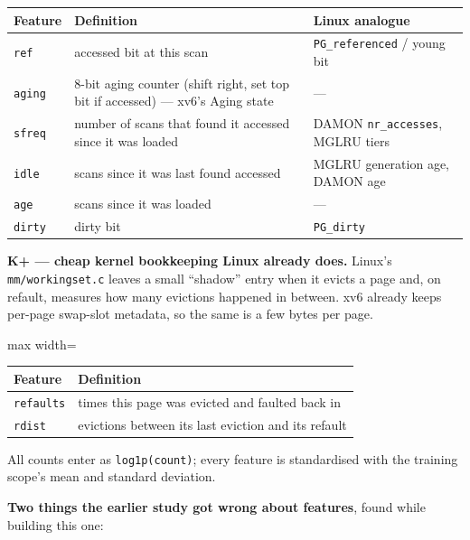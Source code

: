 \documentclass[10pt,a4paper]{article}
\newcommand{\code}[1]{\texttt{#1}}
\begin{document}
\begin{center}\footnotesize
\begin{tabularx}{\linewidth}{lXX}
\toprule
\textbf{Feature} & \textbf{Definition} & \textbf{Linux analogue} \\ \midrule
\code{ref} & accessed bit at this scan & \code{PG\_\allowbreak{}referenced} / young bit \\
\code{aging} & 8-bit aging counter (shift right, set top bit if accessed) — xv6's Aging state & — \\
\code{sfreq} & number of scans that found it accessed since it was loaded & DAMON \code{nr\_\allowbreak{}accesses}, MGLRU tiers \\
\code{idle} & scans since it was last found accessed & MGLRU generation age, DAMON age \\
\code{age} & scans since it was loaded & — \\
\code{dirty} & dirty bit & \code{PG\_\allowbreak{}dirty} \\
\bottomrule
\end{tabularx}
\end{center}

\textbf{K+ — cheap kernel bookkeeping Linux already does.} Linux's \code{mm/\allowbreak{}workingset.\allowbreak{}c} leaves a small ``shadow'' entry when it evicts a page and, on refault, measures how many evictions happened in between. xv6 already keeps per-page swap-slot metadata, so the same is a few bytes per page.

\begin{center}\footnotesize
\begin{adjustbox}{max width=\linewidth}
\begin{tabular}{ll}
\toprule
\textbf{Feature} & \textbf{Definition} \\ \midrule
\code{refaults} & times this page was evicted and faulted back in \\
\code{rdist} & evictions between its last eviction and its refault \\
\bottomrule
\end{tabular}
\end{adjustbox}
\end{center}

All counts enter as \code{log1p(count)}; every feature is standardised with the training scope's mean and standard deviation.

\textbf{Two things the earlier study got wrong about features}, found while building this one:
\end{document}
